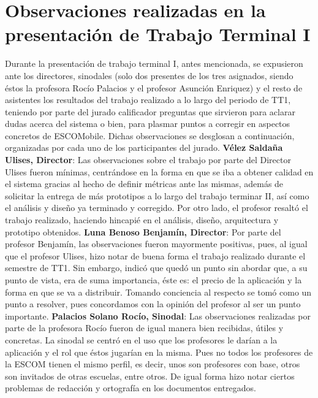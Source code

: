 \newline
\section{Observaciones realizadas en la presentación de Trabajo Terminal I}

\noindent
Durante la presentación de trabajo terminal I, antes mencionada, se expusieron ante los directores, sinodales (solo dos presentes de los tres asignados, siendo éstos la profesora Rocío Palacios y el profesor Asunción Enriquez) y el resto de asistentes los resultados del trabajo realizado a lo largo del periodo de TT1, teniendo por parte del jurado calificador preguntas que sirvieron para aclarar dudas acerca del sistema o bien, para plasmar puntos a corregir en aspectos concretos de ESCOMobile. Dichas observaciones se desglosan a continuación, organizadas por cada uno de los participantes del jurado.  
\newline
\newline
\textbf{Vélez Saldaña Ulises, Director}: Las observaciones sobre el trabajo por parte del Director Ulises fueron mínimas, centrándose en la forma en que se iba a obtener calidad en el sistema gracias al hecho de definir métricas ante las mismas, además de solicitar la entrega de más prototipos a lo largo del trabajo terminar II, así como el análisis y diseño ya terminado y corregido. Por otro lado, el profesor resaltó el trabajo realizado, haciendo hincapié en el análisis, diseño, arquitectura y prototipo obtenidos.
\newline
\newline
\textbf{Luna Benoso Benjamín, Director}: Por parte del profesor Benjamín, las observaciones fueron mayormente positivas, pues, al igual que el profesor Ulises, hizo notar de buena forma el trabajo realizado durante el semestre de TT1. Sin embargo, indicó que quedó un punto sin abordar que, a su punto de vista, era de suma importancia, éste es: el precio de la aplicación y la forma en que se va a distribuir. Tomando conciencia al respecto se tomó como un punto a resolver, pues concordamos con la opinión del profesor al ser un punto importante. 
\newline
\newline
\textbf{Palacios Solano Rocío, Sinodal}: Las observaciones realizadas por parte de la profesora Rocío fueron de igual manera bien recibidas, útiles y concretas. La sinodal se centró en el uso que los profesores le darían a la aplicación y el rol que éstos jugarían en la misma. Pues no todos los profesores de la ESCOM tienen el mismo perfil, es decir, unos son profesores con base, otros son invitados de otras escuelas, entre otros. De igual forma hizo notar ciertos problemas de redacción y ortografía en los documentos entregados. 
